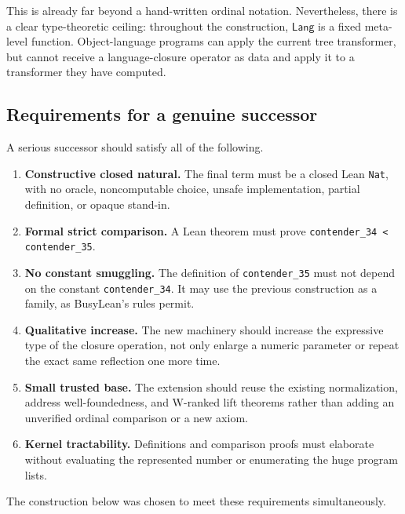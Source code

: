 \documentclass[11pt]{article}
\theoremstyle{definition}
\newcommand{\Lang}{\mathsf{Lang}}
\newcommand{\code}[1]{\texttt{#1}}
\begin{document}
This is already far beyond a hand-written ordinal notation.  Nevertheless,
there is a clear type-theoretic ceiling: throughout the construction,
\(\Lang\) is a fixed meta-level function.  Object-language programs can apply
the current tree transformer, but cannot receive a language-closure operator
as data and apply it to a transformer they have computed.

\subsection{Requirements for a genuine successor}

A serious successor should satisfy all of the following.

\begin{enumerate}[label=\textbf{R\arabic*.},leftmargin=3.2em]
  \item \textbf{Constructive closed natural.}  The final term must be a closed
  Lean \code{Nat}, with no oracle, noncomputable choice, unsafe implementation,
  partial definition, or opaque stand-in.

  \item \textbf{Formal strict comparison.}  A Lean theorem must prove
  \code{contender\_34 < contender\_35}.

  \item \textbf{No constant smuggling.}  The definition of
  \code{contender\_35} must not depend on the constant
  \code{contender\_34}.  It may use the previous construction as a family, as
  BusyLean's rules permit.

  \item \textbf{Qualitative increase.}  The new machinery should increase the
  expressive type of the closure operation, not only enlarge a numeric
  parameter or repeat the exact same reflection one more time.

  \item \textbf{Small trusted base.}  The extension should reuse the existing
  normalization, address well-foundedness, and W-ranked lift theorems rather
  than adding an unverified ordinal comparison or a new axiom.

  \item \textbf{Kernel tractability.}  Definitions and comparison proofs must
  elaborate without evaluating the represented number or enumerating the huge
  program lists.
\end{enumerate}

The construction below was chosen to meet these requirements simultaneously.
\end{document}
